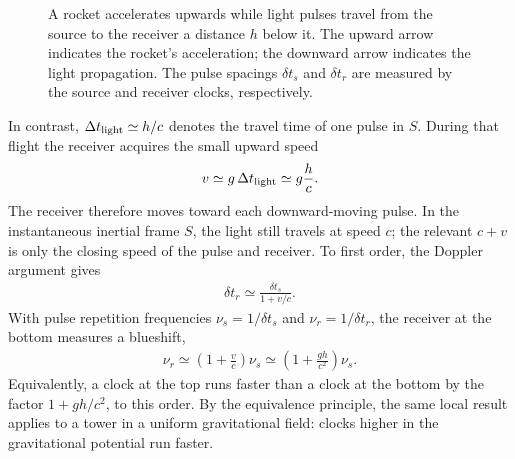 \documentclass[12pt]{article}
\newcommand{\be}{\begin{eqnarray}}
\newcommand{\ee}{\end{eqnarray}}
\begin{document}
\begin{figure}[htbp]
    \centering
    \caption{A rocket accelerates upwards while light pulses travel from the source to the receiver a distance $h$ below it. The upward arrow indicates the rocket's acceleration; the downward arrow indicates the light propagation. The pulse spacings $\delta t_s$ and $\delta t_r$ are measured by the source and receiver clocks, respectively.}
    \label{fig:accelerating-rocket}
\end{figure}

In contrast, $\Delta t_{\rm light}\simeq h/c$ denotes the travel time of one pulse in $S$. During that flight the receiver acquires the small upward speed
\be
v\simeq g\,\Delta t_{\rm light}\simeq g\frac{h}{c}.
\ee
The receiver therefore moves toward each downward-moving pulse. In the instantaneous inertial frame $S$, the light still travels at speed $c$; the relevant $c+v$ is only the closing speed of the pulse and receiver. To first order, the Doppler argument gives
\be
\delta t_r\simeq\frac{\delta t_s}{1+v/c}.
\ee
With pulse repetition frequencies $\nu_s=1/\delta t_s$ and $\nu_r=1/\delta t_r$, the receiver at the bottom measures a blueshift,
\be
\nu_r\simeq\left(1+\frac{v}{c}\right)\nu_s\simeq\left(1+\frac{gh}{c^2}\right)\nu_s.
\ee
Equivalently, a clock at the top runs faster than a clock at the bottom by the factor $1+gh/c^2$, to this order. By the equivalence principle, the same local result applies to a tower in a uniform gravitational field: clocks higher in the gravitational potential run faster.
\end{document}
